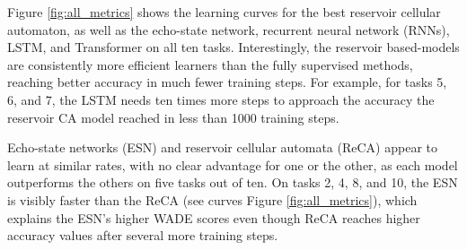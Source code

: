 Figure \ref{fig:all_metrics} shows the learning curves for the best reservoir cellular
automaton, as well as the echo-state network, recurrent neural network (RNNs), LSTM, and Transformer
on all ten tasks. Interestingly, the reservoir based-models are consistently more efficient
learners than the fully supervised methods, reaching better accuracy in much
fewer training steps. For example, for tasks 5, 6, and 7, the LSTM needs ten
times more steps to approach the accuracy the reservoir CA model reached in less
than 1000 training steps.

Echo-state networks (ESN) and reservoir cellular automata (ReCA) appear to learn
at similar rates, with no clear advantage for one or the other, as each model
outperforms the others on five tasks out of ten. On tasks 2, 4, 8, and 10, the ESN
is visibly faster than the ReCA (see curves Figure \ref{fig:all_metrics}), which
explains the ESN's higher WADE scores even though ReCA reaches higher accuracy
values after several more training steps.

